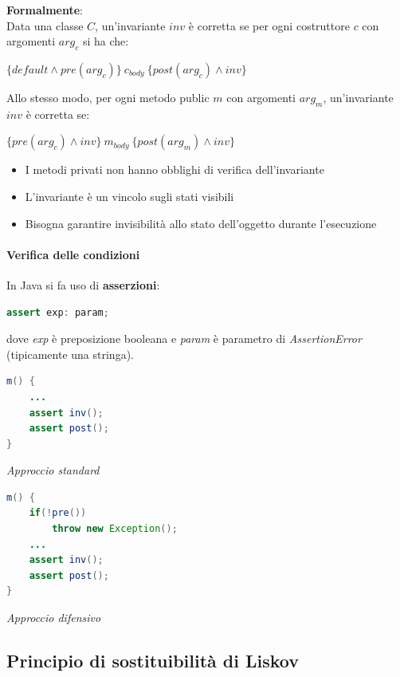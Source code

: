 \textbf{Formalmente}:\\
Data una classe $C$, un'invariante $inv$ è corretta se per ogni costruttore $c$ con argomenti $arg_c$ si ha che:
\begin{center}
    $\{default \land pre(arg_c)\}\ c_{body}\ \{post(arg_c) \land inv\}$
\end{center}
Allo stesso modo, per ogni metodo public $m$ con argomenti $arg_m$, un'invariante $inv$ è corretta se:
\begin{center}
    $\{pre(arg_c) \land inv\}\ m_{body}\ \{post(arg_m) \land inv\}$
\end{center}
\begin{itemize}
    \item I metodi privati non hanno obblighi di verifica dell'invariante
    \item L'invariante è un vincolo sugli stati visibili
    \item Bisogna garantire invisibilità allo stato dell'oggetto durante l'esecuzione
\end{itemize}

\paragraph{Verifica delle condizioni} In Java si fa uso di \textbf{asserzioni}:
\begin{center}
    \begin{lstlisting}[language=Java]
    assert exp: param;    
    \end{lstlisting}
\end{center}
dove \textit{exp} è preposizione booleana e \textit{param} è parametro di \textit{AssertionError} (tipicamente una stringa).

\begin{multicols}{2}
\begin{lstlisting}[language=Java]
m() { 
    ...
    assert inv();
    assert post(); 
}    
\end{lstlisting}
\textit{Approccio standard}
\columnbreak
\begin{lstlisting}[language=Java]
m() {
    if(!pre())
        throw new Exception();
    ...
    assert inv(); 
    assert post(); 
}
\end{lstlisting}
\textit{Approccio difensivo}
\end{multicols}


\subsection{Principio di sostituibilità di Liskov}
\label{liskov}

